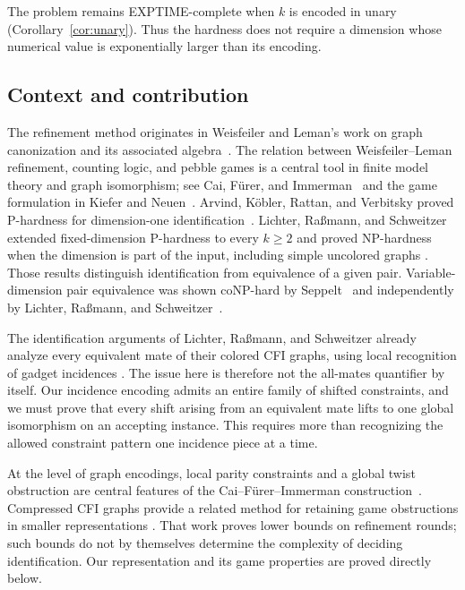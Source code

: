 The problem remains EXPTIME-complete when $k$ is encoded in unary
(Corollary~\ref{cor:unary}). Thus the hardness does not require a
dimension whose numerical value is exponentially larger than its encoding.

\subsection{Context and contribution}

The refinement method originates in Weisfeiler and Leman's work on
graph canonization and its associated algebra~\cite{WL1968}.
The relation between Weisfeiler--Leman refinement, counting logic, and
pebble games is a central tool in finite model theory and graph
isomorphism; see Cai, F\"urer, and Immerman~\cite{CFI1992} and the
game formulation in Kiefer and Neuen~\cite{KN2019}.
Arvind, K\"obler, Rattan, and Verbitsky proved P-hardness for
dimension-one identification~\cite{AKRV2017}. Lichter, Ra\ss mann,
and Schweitzer extended fixed-dimension P-hardness to every $k\ge2$
and proved NP-hardness when the dimension is part of the input,
including simple uncolored graphs
\cite[Theorems~3--4]{LRS2025}.
Those results distinguish identification from equivalence of a given
pair. Variable-dimension pair equivalence was shown coNP-hard by
Seppelt~\cite[Theorem~5]{Seppelt2024} and independently by Lichter,
Ra\ss mann, and Schweitzer~\cite[Theorem~19]{LRS2025}.

The identification arguments of Lichter, Ra\ss mann, and Schweitzer
already analyze every equivalent mate of their colored CFI graphs, using
local recognition of gadget incidences
\cite[Lemma~8 and Claim~9]{LRS2024full}. The issue here is therefore
not the all-mates quantifier by itself. Our incidence encoding admits
an entire family of shifted constraints, and we must prove that every
shift arising from an equivalent mate lifts to one global isomorphism
on an accepting instance. This requires more than recognizing the
allowed constraint pattern one incidence piece at a time.

At the level of graph encodings, local parity constraints and a global
twist obstruction are central features of the Cai--F\"urer--Immerman
construction~\cite{CFI1992}. Compressed CFI graphs provide a related
method for retaining game obstructions in smaller representations
\cite{GLNS2025}. That work proves lower bounds on refinement rounds;
such bounds do not by themselves determine the complexity of deciding
identification. Our representation and its game properties are proved
directly below.


